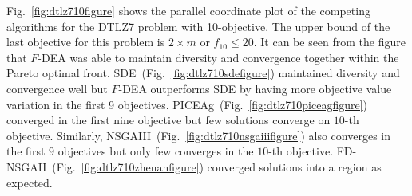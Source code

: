\documentclass[review]{elsarticle}
\begin{document}

Fig.~\ref{fig:dtlz710figure} shows the parallel coordinate plot of the competing algorithms for the DTLZ7 problem with 10-objective.
The upper bound of the last objective for this problem is $2\times m$ or $f_{10}\le 20$. 
It can be seen from the figure that $F$-DEA  was able to maintain diversity and convergence together within the Pareto optimal front. SDE~(Fig.~\ref{fig:dtlz710sdefigure}) maintained diversity and convergence well but $F$-DEA outperforms SDE by having more objective value variation in the first 9 objectives. 
PICEAg~(Fig.~\ref{fig:dtlz710piceagfigure}) converged in the first nine objective but few solutions converge on $10$-th objective. Similarly, NSGAIII~(Fig.~\ref{fig:dtlz710nsgaiiifigure}) also converges in the first $9$ objectives but only few converges in the $10$-th objective.
FD-NSGAII~(Fig.~\ref{fig:dtlz710zhenanfigure}) converged solutions into a region as expected.



%






\end{document}
